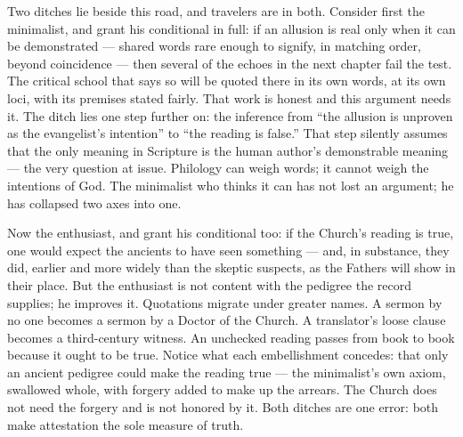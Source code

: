 Two ditches lie beside this road, and travelers are in both. Consider
first the minimalist, and grant his conditional in full: if an allusion is
real only when it can be demonstrated --- shared words rare enough to
signify, in matching order, beyond coincidence --- then several of the
echoes in the next chapter fail the test. The critical school that says so
will be quoted there in its own words, at its own loci, with its premises
stated fairly.
That work is honest and this argument needs it. The ditch lies one step
further on: the inference from ``the allusion is unproven as the
evangelist's intention'' to ``the reading is false.'' That step silently
assumes that the only meaning in Scripture is the human author's
demonstrable meaning --- the very question at issue. Philology can weigh
words; it cannot weigh the intentions of God. The minimalist who thinks it
can has not lost an argument; he has collapsed two axes into one.

Now the enthusiast, and grant his conditional too: if the Church's reading
is true, one would expect the ancients to have seen something --- and, in
substance, they did, earlier and more widely than the skeptic suspects, as
the Fathers will show in their place. But the enthusiast is not content
with the pedigree the record supplies; he improves it. Quotations migrate
under greater names. A sermon by no one becomes a sermon by a Doctor of
the Church. A translator's loose clause becomes a third-century witness.
An unchecked reading passes from book to book because it ought to be
true.
Notice what each embellishment concedes: that only an ancient pedigree
could make the reading true --- the minimalist's own axiom, swallowed
whole, with forgery added to make up the arrears. The Church does not need
the forgery and is not honored by it. Both ditches are one error: both
make attestation the sole measure of truth.


